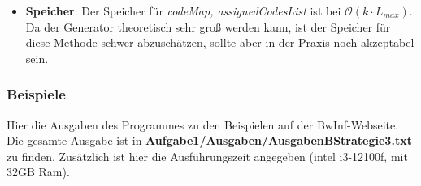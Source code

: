 \documentclass[a4paper,10pt,ngerman]{scrartcl}
\begin{document}
\begin{itemize}
\begin{itemize}
    \item \textbf{Speicher}:
    Der Speicher für \textit{codeMap, assignedCodesList} ist bei $\mathcal{O}(k\cdot L_{max})$. Da der Generator theoretisch sehr groß werden kann, ist der Speicher für diese Methode schwer abzuschätzen, sollte aber in der Praxis noch akzeptabel sein.
  \end{itemize}

\end{itemize}
\subsubsection{Beispiele}
Hier die Ausgaben des Programmes zu den Beispielen auf der BwInf-Webseite. Die gesamte Ausgabe ist in \textbf{Aufgabe1/Ausgaben/AusgabenBStrategie3.txt} zu finden. Zusätzlich ist hier die Ausführungszeit angegeben (intel i3-12100f, mit 32GB Ram).
\end{document}
